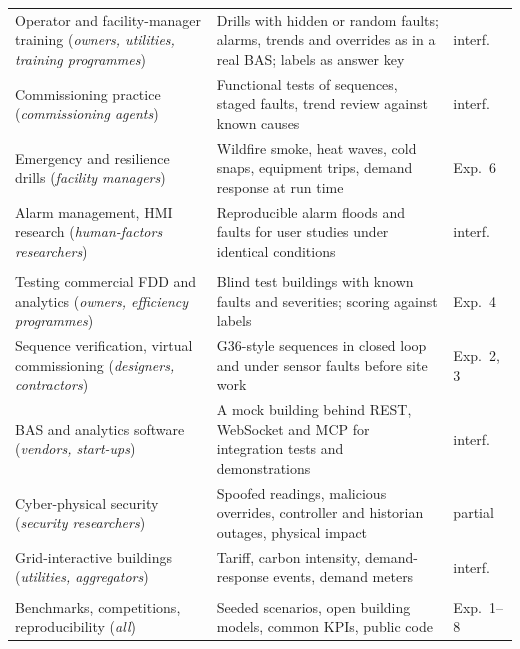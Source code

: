 \documentclass[preprint,12pt,authoryear=false]{elsarticle}
\begin{document}
\begin{table}[p]
\begin{tabularx}{\textwidth}{@{}>{\raggedright\arraybackslash}p{50mm}>{\raggedright\arraybackslash}X>{\raggedright\arraybackslash}p{14mm}@{}}
Operator and facility-manager training (\emph{owners, utilities, training programmes}) & Drills with hidden or random faults; alarms, trends and overrides as in a real BAS; labels as answer key & interf. \\
Commissioning practice (\emph{commissioning agents}) & Functional tests of sequences, staged faults, trend review against known causes & interf. \\
Emergency and resilience drills (\emph{facility managers}) & Wildfire smoke, heat waves, cold snaps, equipment trips, demand response at run time & Exp.~6 \\
Alarm management, HMI research (\emph{human-factors researchers}) & Reproducible alarm floods and faults for user studies under identical conditions \cite{isa182} & interf. \\
\multicolumn{3}{@{}l}{\textbf{Industry practice}}\\
Testing commercial FDD and analytics (\emph{owners, efficiency programmes}) & Blind test buildings with known faults and severities; scoring against labels & Exp.~4 \\
Sequence verification, virtual commissioning (\emph{designers, contractors}) & G36-style sequences in closed loop and under sensor faults before site work \cite{wetter2022obc} & Exp.~2, 3 \\
BAS and analytics software (\emph{vendors, start-ups}) & A mock building behind REST, WebSocket and MCP for integration tests and demonstrations & interf. \\
Cyber-physical security (\emph{security researchers}) & Spoofed readings, malicious overrides, controller and historian outages, physical impact \cite{granzer2010security} & partial \\
Grid-interactive buildings (\emph{utilities, aggregators}) & Tariff, carbon intensity, demand-response events, demand meters \cite{neukomm2019geb} & interf. \\
\multicolumn{3}{@{}l}{\textbf{Research community}}\\
Benchmarks, competitions, reproducibility (\emph{all}) & Seeded scenarios, open building models, common KPIs, public code & Exp.~1--8 \\
\bottomrule
\end{tabularx}
\end{table}
\end{document}
